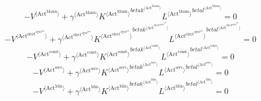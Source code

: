 \begin{equation}
-{V}^{\langle \mathrm{Act}^{\mathrm{Manu}}\rangle} + {{\gamma}^{\langle \mathrm{\mathrm{Act}^{\mathrm{Manu}}}\rangle}} {{{K}^{\langle \mathrm{Act}^{\mathrm{Manu}}\rangle}}^{{{b\!e\!t\!a\!k}}^{\langle \mathrm{\mathrm{Act}^{\mathrm{Manu}}}\rangle}}} {{{L}^{\langle \mathrm{Act}^{\mathrm{Manu}}\rangle}}^{{{b\!e\!t\!a\!l}}^{\langle \mathrm{\mathrm{Act}^{\mathrm{Manu}}}\rangle}}} = 0
\end{equation}
\begin{equation}
-{V}^{\langle \mathrm{Act}^{\mathrm{elect}^{\mathrm{agua}^{\mathrm{gas}}}}\rangle} + {{\gamma}^{\langle \mathrm{\mathrm{Act}^{\mathrm{elect}^{\mathrm{agua}^{\mathrm{gas}}}}}\rangle}} {{{K}^{\langle \mathrm{Act}^{\mathrm{elect}^{\mathrm{agua}^{\mathrm{gas}}}}\rangle}}^{{{b\!e\!t\!a\!k}}^{\langle \mathrm{\mathrm{Act}^{\mathrm{elect}^{\mathrm{agua}^{\mathrm{gas}}}}}\rangle}}} {{{L}^{\langle \mathrm{Act}^{\mathrm{elect}^{\mathrm{agua}^{\mathrm{gas}}}}\rangle}}^{{{b\!e\!t\!a\!l}}^{\langle \mathrm{\mathrm{Act}^{\mathrm{elect}^{\mathrm{agua}^{\mathrm{gas}}}}}\rangle}}} = 0
\end{equation}
\begin{equation}
-{V}^{\langle \mathrm{Act}^{\mathrm{const}}\rangle} + {{\gamma}^{\langle \mathrm{\mathrm{Act}^{\mathrm{const}}}\rangle}} {{{K}^{\langle \mathrm{Act}^{\mathrm{const}}\rangle}}^{{{b\!e\!t\!a\!k}}^{\langle \mathrm{\mathrm{Act}^{\mathrm{const}}}\rangle}}} {{{L}^{\langle \mathrm{Act}^{\mathrm{const}}\rangle}}^{{{b\!e\!t\!a\!l}}^{\langle \mathrm{\mathrm{Act}^{\mathrm{const}}}\rangle}}} = 0
\end{equation}
\begin{equation}
-{V}^{\langle \mathrm{Act}^{\mathrm{serv}}\rangle} + {{\gamma}^{\langle \mathrm{\mathrm{Act}^{\mathrm{serv}}}\rangle}} {{{K}^{\langle \mathrm{Act}^{\mathrm{serv}}\rangle}}^{{{b\!e\!t\!a\!k}}^{\langle \mathrm{\mathrm{Act}^{\mathrm{serv}}}\rangle}}} {{{L}^{\langle \mathrm{Act}^{\mathrm{serv}}\rangle}}^{{{b\!e\!t\!a\!l}}^{\langle \mathrm{\mathrm{Act}^{\mathrm{serv}}}\rangle}}} = 0
\end{equation}
\begin{equation}
-{V}^{\langle \mathrm{Act}^{\mathrm{Min}}\rangle} + {{\gamma}^{\langle \mathrm{\mathrm{Act}^{\mathrm{Min}}}\rangle}} {{{K}^{\langle \mathrm{Act}^{\mathrm{Min}}\rangle}}^{{{b\!e\!t\!a\!k}}^{\langle \mathrm{\mathrm{Act}^{\mathrm{Min}}}\rangle}}} {{{L}^{\langle \mathrm{Act}^{\mathrm{Min}}\rangle}}^{{{b\!e\!t\!a\!l}}^{\langle \mathrm{\mathrm{Act}^{\mathrm{Min}}}\rangle}}} = 0
\end{equation}
